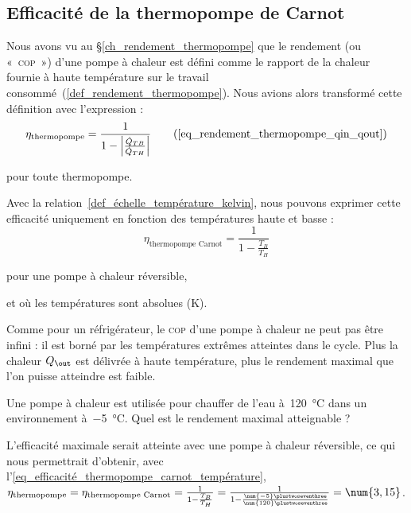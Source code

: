 	\subsection{Efficacité de la thermopompe de Carnot}

		Nous avons vu au \S\ref{ch_rendement_thermopompe} que le rendement (ou «~\textsc{cop}~») d’une pompe à chaleur est défini comme le rapport de la chaleur fournie à haute température sur le travail consommé~(\ref{def_rendement_thermopompe}). Nous avions alors transformé cette définition avec l’expression :
		\begin{equation}
			\eta_\text{thermopompe} = \frac{1}{1 - \left| \frac{\dot Q_{TB}}{\dot Q_{TH}} \right|} \tag{\ref{eq_rendement_thermopompe_qin_qout}}
		\end{equation}
		\begin{equationterms}
			\item pour toute thermopompe.
		\end{equationterms}

		Avec la relation~\ref{def_échelle_température_kelvin}, nous pouvons exprimer cette efficacité uniquement en fonction des températures haute et basse :
		\begin{equation}
			\eta_\text{thermopompe Carnot} = \frac{1}{1 - \frac{T_B}{T_H}}
			\label{eq_efficacité_thermopompe_carnot_température}
		\end{equation}
		\begin{equationterms}
			\item pour une pompe à chaleur réversible,
			\item et où les températures sont absolues (\si{\kelvin}).
		\end{equationterms}

		Comme pour un réfrigérateur, le \textsc{cop} d’une pompe à chaleur ne peut pas être infini : il est borné par les températures extrêmes atteintes dans le cycle. Plus la chaleur $Q_\out$ est délivrée à haute température, plus le rendement maximal que l’on puisse atteindre est faible.
		
		\onlyframabook{\clearpage}
		\begin{anexample}
		 	Une pompe à chaleur est utilisée pour chauffer de l’eau à~\SI{120}{\degreeCelsius} dans un environnement à~\SI{-5}{\degreeCelsius}. Quel est le rendement maximal atteignable ?
		 		\begin{answer}
		 			L’efficacité maximale serait atteinte avec une pompe à chaleur réversible, ce qui nous permettrait d’obtenir, avec l’\cref{eq_efficacité_thermopompe_carnot_température}, $\eta_\text{thermopompe} = \eta_\text{thermopompe Carnot} = \frac{1}{1 - \frac{T_B}{T_H}} = \frac{1}{1 - \frac{\num{-5}\plustwoseventhree}{\num{120}\plustwoseventhree}} = \num{3,15}$.
		 		\end{answer}
		 \end{anexample}
